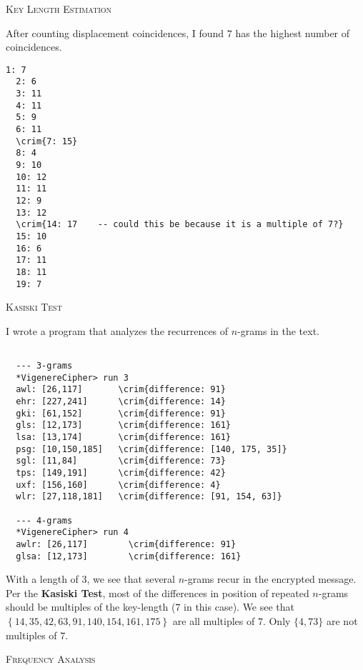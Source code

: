 \begin{Answer}
\begin{center}\textsc{Key Length Estimation}\end{center}
\bigskip
After counting displacement coincidences, I found $7$ has the highest number of coincidences.

\color{zaffre}
\begin{Verbatim}[commandchars=\\\{\}]
  1: 7
  2: 6
  3: 11
  4: 11
  5: 9
  6: 11
  \crim{7: 15}
  8: 4
  9: 10
  10: 12
  11: 11
  12: 9
  13: 12
  \crim{14: 17    -- could this be because it is a multiple of 7?}
  15: 10
  16: 6
  17: 11
  18: 11
  19: 7
\end{Verbatim}
\color{black}
\begin{center}\textsc{Kasiski Test}\end{center}

I wrote a program that analyzes the recurrences of $n$-grams in the text.
\noindent
\color{zaffre}
\begin{Verbatim}[commandchars=\\\{\}]

  --- 3-grams
  *VigenereCipher> run 3
  awl: [26,117]       \crim{difference: 91}
  ehr: [227,241]      \crim{difference: 14}
  gki: [61,152]       \crim{difference: 91}
  gls: [12,173]       \crim{difference: 161}
  lsa: [13,174]       \crim{difference: 161}
  psg: [10,150,185]   \crim{difference: [140, 175, 35]}
  sgl: [11,84]        \crim{difference: 73}
  tps: [149,191]      \crim{difference: 42}
  uxf: [156,160]      \crim{difference: 4}
  wlr: [27,118,181]   \crim{difference: [91, 154, 63]}

  --- 4-grams
  *VigenereCipher> run 4
  awlr: [26,117]        \crim{difference: 91}
  glsa: [12,173]        \crim{difference: 161}
\end{Verbatim}
\color{black}
\noindent
With a length of 3, we see that several $n$-grams recur in the encrypted message.
\newline
Per the \textbf{Kasiski Test}, most of the differences in position
of repeated $n$-grams should be multiples of the key-length ($7$ in this case).
We see that $\left\{14, 35, 42, 63, 91, 140, 154, 161, 175\right\}$ are all multiples of $7$.
Only $\{4, 73\}$ are not multiples of $7$.
\begin{center}
\textsc{Frequency Analysis}
\end{center}


\end{Answer}

